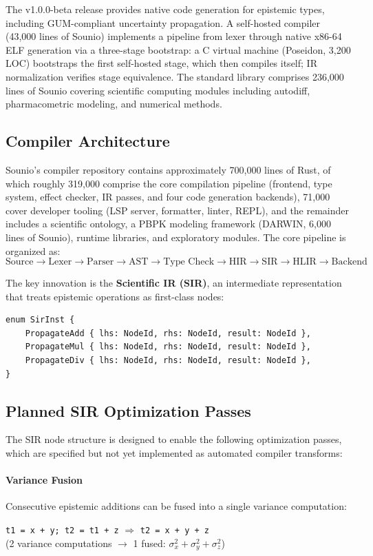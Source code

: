 \documentclass[11pt,a4paper]{article}
\begin{document}
The v1.0.0-beta release provides native code generation for epistemic types,
including GUM-compliant uncertainty propagation.
A self-hosted compiler (43,000 lines of Sounio) implements a pipeline
from lexer through native x86-64 ELF generation via a three-stage
bootstrap: a C virtual machine (Poseidon, 3,200 LOC) bootstraps the
first self-hosted stage, which then compiles itself; IR normalization
verifies stage equivalence. The standard library comprises 236,000
lines of Sounio covering scientific computing modules including autodiff,
pharmacometric modeling, and numerical methods.

\subsection{Compiler Architecture}

Sounio's compiler repository contains approximately 700,000 lines of Rust,
of which roughly 319,000 comprise the core compilation pipeline (frontend,
type system, effect checker, IR passes, and four code generation backends),
71,000 cover developer tooling (LSP server, formatter, linter, REPL), and the
remainder includes a scientific ontology, a PBPK modeling framework
(DARWIN, 6,000 lines of Sounio), runtime libraries, and exploratory modules. The core pipeline is organized as:
\[
\text{Source} \to \text{Lexer} \to \text{Parser} \to \text{AST} \to
\text{Type Check} \to \text{HIR} \to \text{SIR} \to \text{HLIR} \to \text{Backend}
\]

The key innovation is the \textbf{Scientific IR (SIR)}, an intermediate
representation that treats epistemic operations as first-class nodes:

\begin{lstlisting}[caption={SIR epistemic instructions (design)}]
enum SirInst {
    PropagateAdd { lhs: NodeId, rhs: NodeId, result: NodeId },
    PropagateMul { lhs: NodeId, rhs: NodeId, result: NodeId },
    PropagateDiv { lhs: NodeId, rhs: NodeId, result: NodeId },
}
\end{lstlisting}

\subsection{Planned SIR Optimization Passes}

The SIR node structure is designed to enable the following optimization passes,
which are specified but not yet implemented as automated compiler transforms:

\paragraph{Variance Fusion}
Consecutive epistemic additions can be fused into a single variance computation:
\begin{center}
\texttt{t1 = x + y; t2 = t1 + z} $\Rightarrow$ \texttt{t2 = x + y + z}\\
(2 variance computations $\to$ 1 fused: $\sigma_x^2 + \sigma_y^2 + \sigma_z^2$)
\end{center}
\end{document}
